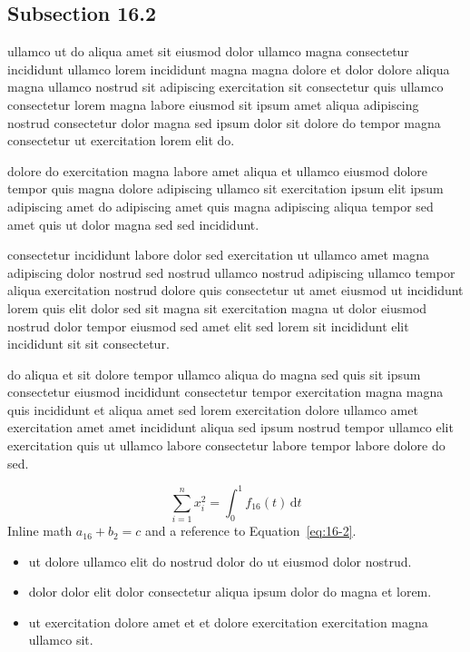 \documentclass{article}
\begin{document}
\subsection{Subsection 16.2}\label{sec:16-2}
ullamco ut do aliqua amet sit eiusmod dolor ullamco magna consectetur incididunt ullamco lorem incididunt magna magna dolore et dolor dolore aliqua magna ullamco nostrud sit adipiscing exercitation sit consectetur quis ullamco consectetur lorem magna labore eiusmod sit ipsum amet aliqua adipiscing nostrud consectetur dolor magna sed ipsum dolor sit dolore do tempor magna consectetur ut exercitation lorem elit do.

dolore do exercitation magna labore amet aliqua et ullamco eiusmod dolore tempor quis magna dolore adipiscing ullamco sit exercitation ipsum elit ipsum adipiscing amet do adipiscing amet quis magna adipiscing aliqua tempor sed amet quis ut dolor magna sed sed incididunt.

consectetur incididunt labore dolor sed exercitation ut ullamco amet magna adipiscing dolor nostrud sed nostrud ullamco nostrud adipiscing ullamco tempor aliqua exercitation nostrud dolore quis consectetur ut amet eiusmod ut incididunt lorem quis elit dolor sed sit magna sit exercitation magna ut dolor eiusmod nostrud dolor tempor eiusmod sed amet elit sed lorem sit incididunt elit incididunt sit sit consectetur.

do aliqua et sit dolore tempor ullamco aliqua do magna sed quis sit ipsum consectetur eiusmod incididunt consectetur tempor exercitation magna magna quis incididunt et aliqua amet sed lorem exercitation dolore ullamco amet exercitation amet amet incididunt aliqua sed ipsum nostrud tempor ullamco elit exercitation quis ut ullamco labore consectetur labore tempor labore dolore do sed.

\begin{equation}\label{eq:16-2}
  \sum_{i=1}^{n} x_i^{2} = \int_0^1 f_{16}(t)\,\mathrm{d}t
\end{equation}
Inline math $a_{16} + b_{2} = c$ and a reference to Equation~\eqref{eq:16-2}.

\begin{itemize}
  \item ut dolore ullamco elit do nostrud dolor do ut eiusmod dolor nostrud.
  \item dolor dolor elit dolor consectetur aliqua ipsum dolor do magna et lorem.
  \item ut exercitation dolore amet et et dolore exercitation exercitation magna ullamco sit.
\end{itemize}
\end{document}
